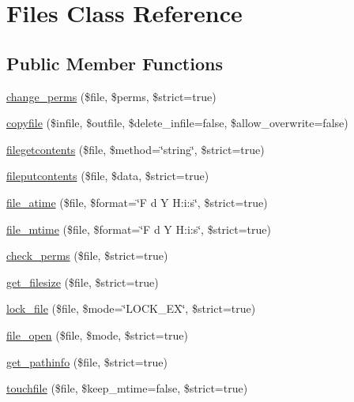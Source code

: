 \hypertarget{class_files}{\section{Files Class Reference}
\label{class_files}
}
\subsection*{Public Member Functions}
\begin{DoxyCompactItemize}
\item 
\hyperlink{class_files_ac196be8fefb7dec34812964068ae7a66}{change\-\_\-perms} (\$file, \$perms, \$strict=true)
\item 
\hyperlink{class_files_a96eead56a73178e8ebb8da558e079486}{copyfile} (\$infile, \$outfile, \$delete\-\_\-infile=false, \$allow\-\_\-overwrite=false)
\item 
\hyperlink{class_files_a491ab39a3965deee22808d2188d073c2}{filegetcontents} (\$file, \$method=\char`\"{}string\char`\"{}, \$strict=true)
\item 
\hyperlink{class_files_a6fcd6647509d9b0dc63b921959fee7e6}{fileputcontents} (\$file, \$data, \$strict=true)
\item 
\hyperlink{class_files_a5ac9023a2b098dba4d757d5e4cc8ea33}{file\-\_\-atime} (\$file, \$format=\char`\"{}F d Y H\-:i\-:s\char`\"{}, \$strict=true)
\item 
\hyperlink{class_files_a631ce075c1f227e707ee59366847c016}{file\-\_\-mtime} (\$file, \$format=\char`\"{}F d Y H\-:i\-:s\char`\"{}, \$strict=true)
\item 
\hyperlink{class_files_a5c1ecf5a42eea0ed22c376b15d91a339}{check\-\_\-perms} (\$file, \$strict=true)
\item 
\hyperlink{class_files_ad2e2b31a53f63b865a0836bb244a92d7}{get\-\_\-filesize} (\$file, \$strict=true)
\item 
\hyperlink{class_files_a691c4abd483a933fd272f072d71b6b73}{lock\-\_\-file} (\$file, \$mode=\char`\"{}L\-O\-C\-K\-\_\-\-E\-X\char`\"{}, \$strict=true)
\item 
\hyperlink{class_files_af78749dfb9df77b042c7c08eac0cfb40}{file\-\_\-open} (\$file, \$mode, \$strict=true)
\item 
\hyperlink{class_files_a301e528476292dd5e72a811bcd03aa49}{get\-\_\-pathinfo} (\$file, \$strict=true)
\item 
\hyperlink{class_files_aa9692869f71d1ade22a78f287d97d69b}{touchfile} (\$file, \$keep\-\_\-mtime=false, \$strict=true)
\item 

\end{DoxyCompactItemize}
